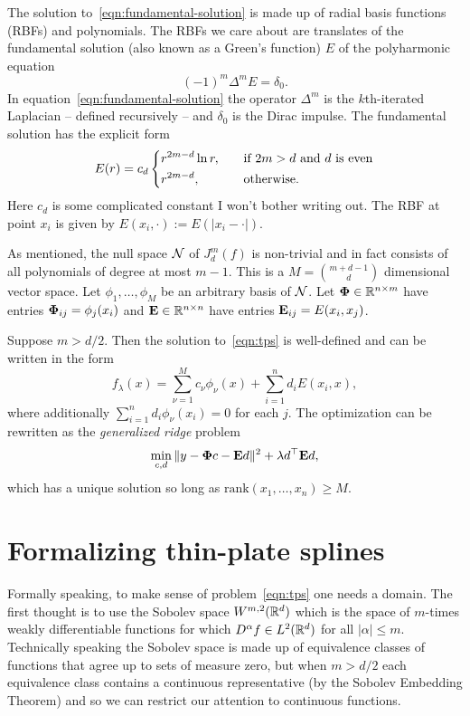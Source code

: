 \documentclass{article}
\begin{document}
The solution to~\eqref{eqn:fundamental-solution} is made up of radial basis functions (RBFs) and polynomials. The RBFs we care about are translates of the fundamental solution (also known as a Green's function) $E$ of the polyharmonic equation
\begin{equation}
	\label{eqn:fundamental-solution}
	(-1)^m\Delta^{m} E = \delta_0.
\end{equation}
In equation~\eqref{eqn:fundamental-solution} the operator $\Delta^{m}$ is the $k$th-iterated Laplacian -- defined recursively -- and $\delta_0$ is the Dirac impulse. The fundamental solution has the explicit form
\begin{equation*}
	E(r) =  c_d 
	\begin{dcases}
		r^{2m - d} \ln r, \quad & \textrm{if $2m > d$ and $d$ is even} \\
		r^{2m - d}, \quad & \textrm{otherwise.}
	\end{dcases}
\end{equation*}
Here $c_d$ is some complicated constant I won't bother writing out. The RBF at point $x_i$ is given by $E(x_i,\cdot) := E(|x_i - \cdot|)$. 

As mentioned, the null space $\mathcal{N}$ of $J_d^m(f)$ is non-trivial and in fact consists of all polynomials of degree at most $m - 1$. This is a $M = {m + d - 1\choose d}$ dimensional vector space. Let $\phi_{1},\ldots,\phi_M$ be an arbitrary basis of $\mathcal{N}$. Let ${\bf \Phi} \in \mathbb{R}^{n \times m}$ have entries ${\bf \Phi}_{ij} = \phi_j(x_i)$ and ${\bf E} \in \mathbb{R}^{n \times n}$ have entries ${\bf E}_{ij} = E(x_i,x_j)$. 
\begin{theorem}
	\label{thm:tps-representer}
	Suppose $m > d/2$. Then the solution to~\eqref{eqn:tps} is well-defined and can be written in the form 
	$$f_{\lambda}(x) = \sum_{\nu = 1}^{M} c_{\nu} \phi_{\nu}(x) + \sum_{i = 1}^{n} d_i E(x_i,x),$$ 
	where additionally $\sum_{i = 1}^{n} d_i \phi_{\nu}(x_i) = 0$ for each $j$. The optimization can be rewritten as the \emph{generalized ridge} problem
	\begin{equation}
		\label{eqn:tps-ridge}
		\min_{c,d} \|y - {\bf \Phi} c - {\bf E} d\|^2 + \lambda d^{\top} {\bf E} d,
	\end{equation}
	which has a unique solution so long as $\mathrm{rank}(x_1,\ldots,x_n) \geq M$.
\end{theorem}

\section{Formalizing thin-plate splines}
Formally speaking, to make sense of problem~\eqref{eqn:tps} one needs a domain. The first thought is to use the Sobolev space $W^{m,2}(\mathbb{R}^d)$ which is the space of $m$-times weakly differentiable functions for which $D^{\alpha}f \in L^2(\mathbb{R}^d)$ for all $|\alpha| \leq m$. Technically speaking the Sobolev space is made up of equivalence classes of functions that agree up to sets of measure zero, but when $m > d/2$ each equivalence class contains a continuous representative (by the Sobolev Embedding Theorem) and so we can restrict our attention to continuous functions.  
\end{document}
